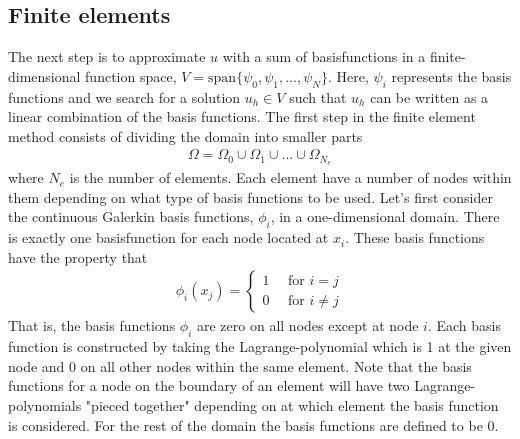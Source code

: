 \subsection{Finite elements}
The next step is to approximate $u$ with a sum of basisfunctions in a finite-dimensional function space, $V = \text{span}\{\psi_0, \psi_1, ..., \psi_N\}$. Here, $\psi_i$ represents the basis functions and we search for a solution $u_h \in V$ such that $u_h$ can be written as a linear combination of the basis functions. 
The first step in the finite element method consists of dividing the domain into smaller parts
\begin{align*}
\Omega = \Omega_0 \cup \Omega_1 \cup ... \cup \Omega_{N_e}
\end{align*}
where $N_e$ is the number of elements. Each element have a number of nodes within them depending on what type of basis functions to be used. Let's first consider the continuous Galerkin basis functions, $\phi_i$, in a one-dimensional domain. There is exactly one basisfunction for each node located at $x_i$. These basis functions have the property that
\begin{align*}
\phi_i(x_j) = \begin{cases}
				1 \quad \text{ for } i=j \\
				0 \quad \text{ for } i\neq j
		 		\end{cases}
\end{align*}
That is, the basis functions $\phi_i$ are zero on all nodes except at node $i$. Each basis function is constructed by taking the Lagrange-polynomial which is 1 at the given node and 0 on all other nodes within the same element. Note that the basis functions for a node on the boundary of an element will have two Lagrange-polynomials "pieced together" depending on at which element the basis function is considered. For the rest of the domain the basis functions are defined to be 0. \\ \\

